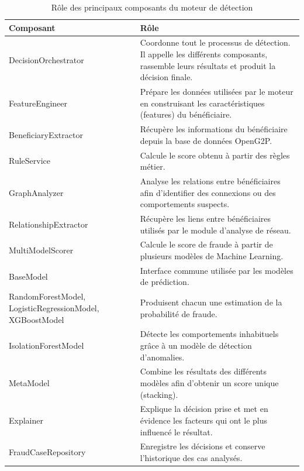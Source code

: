 \documentclass[a4paper, oneside, 12pt]{book}
\begin{document}
\begin{table}[H]
\centering
\footnotesize
\renewcommand{\arraystretch}{1.2}
\begin{tabular}{|p{4.2cm}|p{10.2cm}|}
\hline
\textbf{Composant} & \textbf{Rôle} \\
\hline
DecisionOrchestrator &
Coordonne tout le processus de détection. Il appelle les différents composants, rassemble leurs résultats et produit la décision finale. \\
\hline
FeatureEngineer &
Prépare les données utilisées par le moteur en construisant les caractéristiques (features) du bénéficiaire. \\
\hline
BeneficiaryExtractor &
Récupère les informations du bénéficiaire depuis la base de données OpenG2P. \\
\hline
RuleService &
Calcule le score obtenu à partir des règles métier. \\
\hline
GraphAnalyzer &
Analyse les relations entre bénéficiaires afin d'identifier des connexions ou des comportements suspects. \\
\hline
RelationshipExtractor &
Récupère les liens entre bénéficiaires utilisés par le module d'analyse de réseau. \\
\hline
MultiModelScorer &
Calcule le score de fraude à partir de plusieurs modèles de Machine Learning. \\
\hline
BaseModel &
Interface commune utilisée par les modèles de prédiction. \\
\hline
RandomForestModel, LogisticRegressionModel, XGBoostModel &
Produisent chacun une estimation de la probabilité de fraude. \\
\hline
IsolationForestModel &
Détecte les comportements inhabituels grâce à un modèle de détection d'anomalies. \\
\hline
MetaModel &
Combine les résultats des différents modèles afin d'obtenir un score unique (stacking). \\
\hline
Explainer &
Explique la décision prise et met en évidence les facteurs qui ont le plus influencé le résultat. \\
\hline
FraudCaseRepository &
Enregistre les décisions et conserve l'historique des cas analysés. \\
\hline
\end{tabular}
\caption{Rôle des principaux composants du moteur de détection}
\label{tab:composants-ml}
\end{table}
\end{document}

